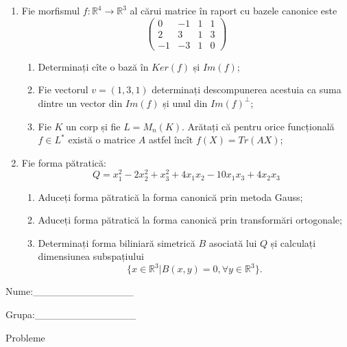 \documentclass{article}
\begin{document}
\begin{enumerate}
 \item Fie morfismul $f:\mathbb{R}^4 \to \mathbb{R}^3$ al cărui matrice în raport cu bazele canonice este
$$\begin{pmatrix}
0&-1&1&1\\
2&3&1&3\\
-1&-3&1&0
\end{pmatrix}$$

\begin{enumerate}
\item Determinați cîte o bază în $Ker(f)$ și $Im(f)$;
\item Fie vectorul $v=(1,3,1)$ determinați descompunerea acestuia ca suma dintre un vector din $Im(f)$ și unul din $Im(f)^\perp$;
\item Fie $K$ un corp și fie $L=M_n(K)$. Arătați că pentru orice funcțională $f \in L^*$ există o matrice $A$ astfel încît $f(X)=Tr(AX)$;
\end{enumerate}
\item Fie forma pătratică:
$$Q= x_1^2-2x_2^2+x_3^2+4x_1x_2-10x_1x_3+4x_2x_3$$

\begin{enumerate}
\item Aduceți forma pătratică la forma canonică prin metoda Gauss;
\item Aduceți forma pătratică la forma canonică prin transformări ortogonale;
\item Determinați forma biliniară simetrică $B$ asociată lui $Q$ și calculați dimensiunea subspațiului
$$\{x \in \mathbb{R}^3 | B(x,y)=0,\forall y \in \mathbb{R}^3\}.$$

\end{enumerate}
\end{enumerate}
\newpage
\begin{flushright}
Nume:\_\_\_\_\_\_\_\_\_\_\_\_\_\_
 
 
Grupa:\_\_\_\_\_\_\_\_\_\_\_\_\_\_
\end{flushright}
\begin{center}
\vspace{2cm}
{\Large Probleme}
\vspace{2cm}
\end{center}
\end{document}
